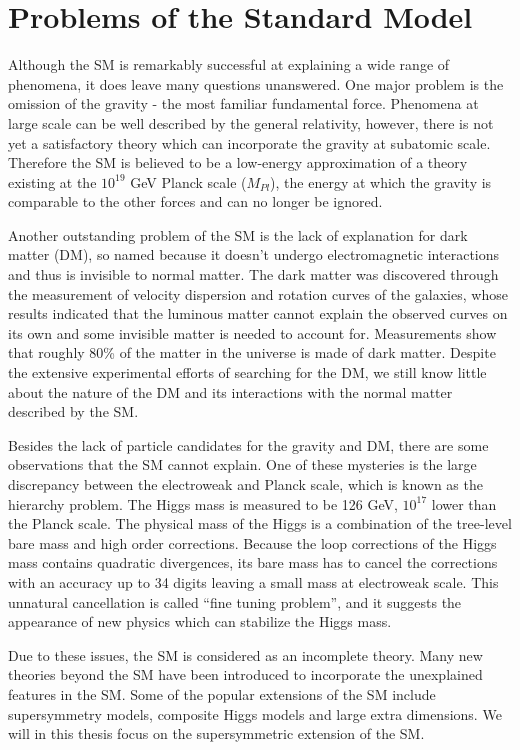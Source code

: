 \documentclass[thesis.tex]{subfiles}
\begin{document}
\FloatBarrier
\section{Problems of the Standard Model}
Although the SM is remarkably successful at explaining a wide range of phenomena, it does leave many questions unanswered. 
One major problem is the omission of the gravity - the most familiar fundamental force. 
Phenomena at large scale can be well described by the general relativity, however, there is not yet a satisfactory theory which can incorporate the gravity at subatomic scale. 
Therefore the SM is believed to be a low-energy approximation of a theory existing at the $10^{19}$ GeV Planck scale ($M_{Pl}$), the energy at which the gravity is comparable to the other forces and can no longer be ignored.

Another outstanding problem of the SM is the lack of explanation for dark matter (DM), so named because it doesn't undergo electromagnetic interactions and thus is invisible to normal matter. The dark matter was discovered through the measurement of velocity dispersion and rotation curves of the galaxies, whose results indicated that the luminous matter cannot explain the observed curves on its own and some invisible matter is needed to account for. Measurements show that roughly 80\% of the matter in the universe is made of dark matter. Despite the extensive experimental efforts of searching for the DM, we still know little about the nature of the DM and its interactions with the normal matter described by the SM. 

Besides the lack of particle candidates for the gravity and DM, there are some observations that the SM  cannot explain. 
One of these mysteries is the large discrepancy between the electroweak and Planck scale, which is known as the hierarchy problem. 
The Higgs mass is measured to be 126 GeV, $10^{17}$ lower than the Planck scale. 
The physical mass of the Higgs is a combination of the tree-level bare mass and high order corrections. 
Because the loop corrections of the Higgs mass contains quadratic divergences, its bare mass has to cancel the corrections with an accuracy up to 34 digits leaving a small mass at electroweak scale. 
This unnatural cancellation is called ``fine tuning problem'', and it suggests the appearance of new physics which can stabilize the Higgs mass.

Due to these issues, the SM is considered as an incomplete theory.
Many new theories beyond the SM have been introduced to incorporate the unexplained features in the SM. 
Some of the popular extensions of the SM include supersymmetry models, composite Higgs models and large extra dimensions.
We will in this thesis focus on the supersymmetric extension of the SM.    
\end{document}
